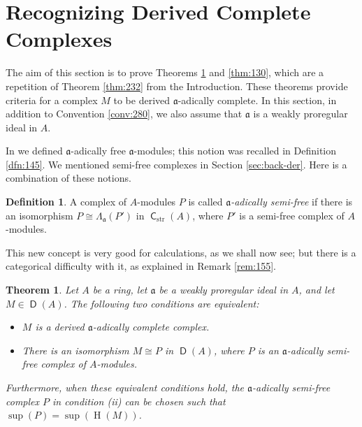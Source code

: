 \documentclass[10pt]{amsart}
\newtheorem{thm}[equation]{Theorem}
\theoremstyle{definition}
\newtheorem{dfn}[equation]{Definition}
\numberwithin{equation}{section}
\newcommand{\opn}{\operatorname}
\newcommand{\cat}[1]{\operatorname{\mathsf{#1}}}
\newcommand{\rmitem}[1]{\item[\textrm{(#1)}]}
\newcommand{\mfrak}[1]{\mathfrak{#1}}
\newcommand{\mrm}[1]{\mathrm{#1}}
\newcommand{\La}{\Lambda}
\renewcommand{\a}{\mfrak{a}}
\newcommand{\tup}[1]{\textrm{#1}}
\begin{document}
\section{Recognizing Derived Complete Complexes}
\label{sec:recognize}

The aim of this section is to prove Theorems
\ref{thm:155} and \ref{thm:130}, which are a repetition of
Theorem \ref{thm:232} from the Introduction.
These theorems provide criteria for a complex $M$ to be derived $\a$-adically
complete. In this section, in addition to Convention \ref{conv:280}, we also
assume that $\a$ is a weakly proregular ideal in $A$.

In \cite{Ye1} we defined $\a$-adically free $\a$-modules; this notion was
recalled in Definition \ref{dfn:145}.
We mentioned semi-free complexes in Section \ref{sec:back-der}.
Here is a combination of these notions.

\begin{dfn} \label{dfn:155}
A complex of $A$-modules $P$ is called {\em $\a$-adically semi-free} if
there is an isomorphism
$P \cong \La_{\a}(P')$ in $\cat{C}_{\mrm{str}}(A)$, where
$P'$ is a semi-free complex of $A$-modules.
\end{dfn}

This new concept is very good for calculations, as we shall now see; but there
is a categorical difficulty with it, as explained in Remark \ref{rem:155}.

\begin{thm} \label{thm:155}
Let $A$ be a ring, let $\a$ be a weakly proregular ideal in $A$, and
let $M \in \cat{D}(A)$. The following two conditions are equivalent:
\begin{itemize}
\rmitem{i} $M$ is a derived $\a$-adically complete complex.

\rmitem{ii} There is an isomorphism $M \cong P$
in $\cat{D}(A)$, where $P$ is an $\a$-adically semi-free complex of
$A$-modules.
\end{itemize}
Furthermore, when these equivalent conditions hold, the $\a$-adically semi-free
complex $P$ in condition \tup{(ii)} can be chosen such that
$\opn{sup}(P) = \opn{sup}(\opn{H}(M))$.
\end{thm}
\end{document}
